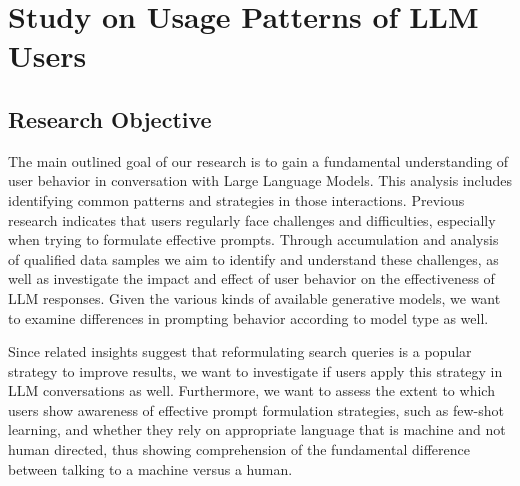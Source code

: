 \section{Study on Usage Patterns of LLM Users}
\label{sec:study-on-usage-patterns-of-llm-users}

\subsection{Research Objective}
\label{subsec:research-objective}
The main outlined goal of our research is to gain a fundamental understanding of user behavior in conversation with Large Language Models.
This analysis includes identifying common patterns and strategies in those interactions.
Previous research indicates that users regularly face challenges and difficulties, especially
when trying to formulate effective prompts.
Through accumulation and analysis of qualified data samples we aim to identify and understand these
challenges,
as well as investigate the impact and effect of user behavior on the effectiveness of LLM responses.
Given the various kinds of available generative models, we want to examine differences in
prompting behavior according to model type as well.

Since related insights suggest that reformulating search queries is a popular strategy to improve
results, we want to investigate if users apply this strategy in LLM conversations as well. %
Furthermore, we want to assess the extent to which users show awareness of effective prompt
formulation strategies, such as few-shot learning, and whether they rely on appropriate language
that is machine and not human directed, thus showing comprehension of the fundamental difference
between talking to a machine versus a human.

